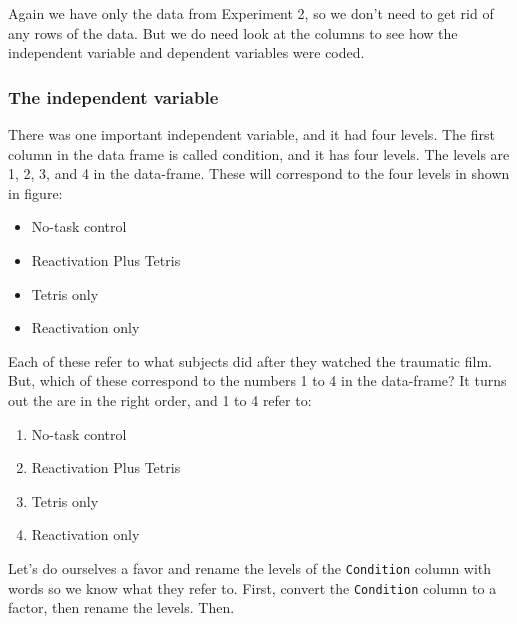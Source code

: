 \documentclass[
]{book}
\newenvironment{Shaded}{\begin{snugshade}}{\end{snugshade}}
\newcommand{\FunctionTok}[1]{\textcolor[rgb]{0.00,0.00,0.00}{#1}}
\newcommand{\NormalTok}[1]{#1}
\newcommand{\OtherTok}[1]{\textcolor[rgb]{0.56,0.35,0.01}{#1}}
\newcommand{\SpecialCharTok}[1]{\textcolor[rgb]{0.00,0.00,0.00}{#1}}
\newcommand{\StringTok}[1]{\textcolor[rgb]{0.31,0.60,0.02}{#1}}
\providecommand{\tightlist}{%
  \setlength{\itemsep}{0pt}\setlength{\parskip}{0pt}}
\begin{document}
Again we have only the data from Experiment 2, so we don't need to get rid of any rows of the data. But we do need look at the columns to see how the independent variable and dependent variables were coded.

\hypertarget{the-independent-variable}{%
\subsubsection{The independent variable}\label{the-independent-variable}}

There was one important independent variable, and it had four levels. The first column in the data frame is called condition, and it has four levels. The levels are 1, 2, 3, and 4 in the data-frame. These will correspond to the four levels in shown in figure:

\begin{itemize}
\tightlist
\item
  No-task control
\item
  Reactivation Plus Tetris
\item
  Tetris only
\item
  Reactivation only
\end{itemize}

Each of these refer to what subjects did after they watched the traumatic film. But, which of these correspond to the numbers 1 to 4 in the data-frame? It turns out the are in the right order, and 1 to 4 refer to:

\begin{enumerate}
\def\labelenumi{\arabic{enumi}.}
\tightlist
\item
  No-task control
\item
  Reactivation Plus Tetris
\item
  Tetris only
\item
  Reactivation only
\end{enumerate}

Let's do ourselves a favor and rename the levels of the \texttt{Condition} column with words so we know what they refer to. First, convert the \texttt{Condition} column to a factor, then rename the levels. Then.

\begin{Shaded}
\end{Shaded}
\end{document}
